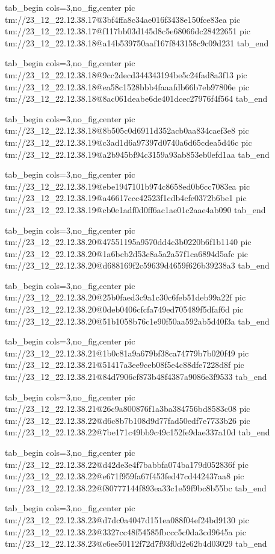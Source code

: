 \ifcmt
  tab_begin cols=3,no_fig,center
    pic tm://23_12_22.12.38.17@3bf4ffa8c34ae016f3438e150fce83ea
    pic tm://23_12_22.12.38.17@f117bb03d145d8c5e68066dc28422651
    pic tm://23_12_22.12.38.18@a14b539750aaf167f843158c9c09d231
  tab_end
\fi


\ifcmt
  tab_begin cols=3,no_fig,center
    pic tm://23_12_22.12.38.18@9cc2decd344343194be5c24fad8a3f13
    pic tm://23_12_22.12.38.18@ea58c1528bbb4faaafdb66b7eb97806e
    pic tm://23_12_22.12.38.18@8ac061deabe6de401dcec27976f4f564
  tab_end
\fi


\ifcmt
  tab_begin cols=3,no_fig,center
    pic tm://23_12_22.12.38.18@8b505c0d6911d352acb0aa834caef3e8
    pic tm://23_12_22.12.38.19@c3ad1d6a97397d0740a6d65cdea5d46c
    pic tm://23_12_22.12.38.19@a2b945bf94c3159a93ab853eb0efd1aa
  tab_end
\fi


\ifcmt
  tab_begin cols=3,no_fig,center
    pic tm://23_12_22.12.38.19@ebe1947101b974c8658ed0b6cc7083ea
    pic tm://23_12_22.12.38.19@a46617ccc42523f1cdb4cfe0372b6be1
    pic tm://23_12_22.12.38.19@cb0e1adf0d0ff6ac1ae01c2aae4ab090
  tab_end
\fi


\ifcmt
  tab_begin cols=3,no_fig,center
    pic tm://23_12_22.12.38.20@47551195a9570dd4c3b0220b6f1b1140
    pic tm://23_12_22.12.38.20@1a6bcb2d53c8a5a2a57f1ca6894d5afc
    pic tm://23_12_22.12.38.20@d688169f2c59639d4659f626b39238a3
  tab_end
\fi


\ifcmt
  tab_begin cols=3,no_fig,center
    pic tm://23_12_22.12.38.20@25b0faed3c9a1c30c6feb51deb99a22f
    pic tm://23_12_22.12.38.20@0deb0406cfcfa749ed705489f5dfaf6d
    pic tm://23_12_22.12.38.20@51b1058b76c1e90f50aa592ab5d40f3a
  tab_end
\fi


\ifcmt
  tab_begin cols=3,no_fig,center
    pic tm://23_12_22.12.38.21@1b0c81a9a679bf38ca74779b7b020f49
    pic tm://23_12_22.12.38.21@51417a3ee9ceb08f5e4c88dfe7228d8f
    pic tm://23_12_22.12.38.21@84d7906cf873b48f4387a9086e3f9533
  tab_end
\fi


\ifcmt
  tab_begin cols=3,no_fig,center
    pic tm://23_12_22.12.38.21@26c9a800876f1a3ba384756bd8583c08
    pic tm://23_12_22.12.38.22@d6c8b7b108d9d77fad50edf7e7733b26
    pic tm://23_12_22.12.38.22@7be171c49bb9c49c152fe9dae337a10d
  tab_end
\fi


\ifcmt
  tab_begin cols=3,no_fig,center
    pic tm://23_12_22.12.38.22@d42de3e4f7babbfa074ba179d052836f
    pic tm://23_12_22.12.38.22@e671f959fa67f453fed47cd442437aa8
    pic tm://23_12_22.12.38.22@f80777144f893ea33c1e59f9bc8b55bc
  tab_end
\fi


\ifcmt
  tab_begin cols=3,no_fig,center
    pic tm://23_12_22.12.38.23@d7dc0a4047d151ea088f04ef24bd9130
    pic tm://23_12_22.12.38.23@3327cc48f54585fbccc5c0da3cd9645a
    pic tm://23_12_22.12.38.23@c6ee50112f72d7f93f0d2e62b4d03029
  tab_end
\fi


